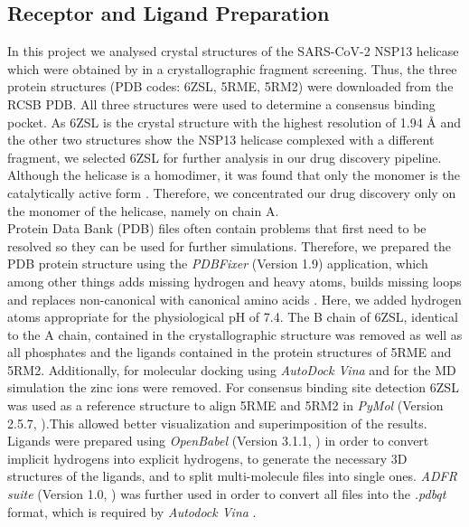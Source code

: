 \documentclass[11pt, letterpaper, titlepage]{article}
\renewcommand{\cite}{\parencite}
\begin{document}
\subsection{Receptor and Ligand Preparation}
In this project we analysed crystal structures of the \ac{SARS-CoV-2} \ac{NSP13} helicase which were obtained by \cite{NSP13_basics} in a crystallographic fragment screening. Thus, the three protein structures (PDB codes: 6ZSL, 5RME, 5RM2) were downloaded from the \ac{RCSB PDB}. All three structures were used to determine a consensus binding pocket. As 6ZSL is the crystal structure with the highest resolution of 1.94 {\AA} and the other two structures show the \ac{NSP13} helicase complexed with a different fragment, we selected 6ZSL for further analysis in our drug discovery pipeline. Although the helicase is a homodimer, it was found that only the monomer is the catalytically active form \cite{Berta_2021}. Therefore, we concentrated our drug discovery only on the monomer of the helicase, namely on chain A. \\
Protein Data Bank (PDB) files often contain problems that first need to be resolved so they can be used for further simulations. Therefore, we prepared the PDB protein structure using the \textit{PDBFixer} (Version 1.9) application, which among other things adds missing hydrogen and heavy atoms, builds missing loops and replaces non-canonical with canonical amino acids \cite{Eastman_2017}. Here, we added hydrogen atoms appropriate for the physiological pH of 7.4. The B chain of 6ZSL, identical to the A chain, contained in the crystallographic structure was removed as well as all phosphates and the ligands contained in the protein structures of 5RME and 5RM2. Additionally, for molecular docking using \textit{AutoDock Vina} %
and for the \ac{MD} simulation the zinc ions were removed. For consensus binding site detection 6ZSL was used as a reference structure to align 5RME and 5RM2 in \textit{PyMol} (Version 2.5.7, \textcite{PyMol_endnote}).This allowed better visualization and superimposition of the results.\\ 
Ligands were prepared using \textit{OpenBabel} (Version 3.1.1, \textcite{OpenBabel}) in order to convert implicit hydrogens into explicit hydrogens, to generate the necessary 3D structures of the ligands, and to split multi-molecule files into single ones. \textit{ADFR suite} (Version 1.0, \textcite{AutoDockFR}) was further used in order to convert all files into the \textit{.pdbqt} format, which is required by \textit{Autodock Vina} \cite{Trott.2010}. 
\end{document}
